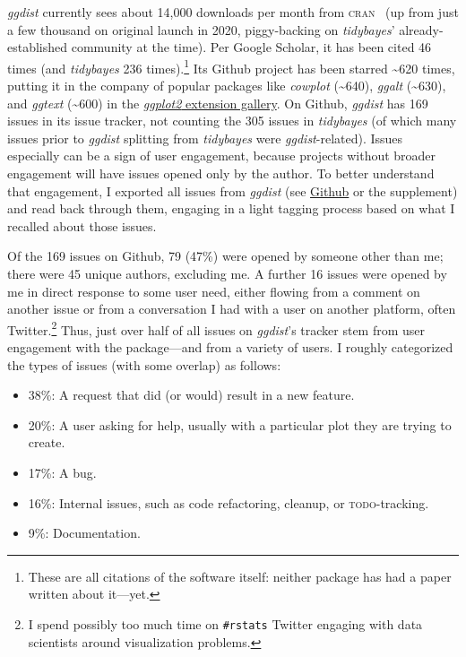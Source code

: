 \documentclass[journal]{vgtc}              %
\begin{document}
\textit{ggdist} currently sees about 14,000 downloads per month from \textsc{cran}~\cite{csardi2019cranlogs} (up from just a few thousand on original launch in 2020, piggy-backing on \textit{tidybayes}' already-established community at the time). Per Google Scholar, it has been cited 46 times (and \textit{tidybayes} 236 times).\footnote{These are all citations of the software itself: neither package has had a paper written about it---yet.} Its Github project has been starred \textasciitilde 620 times, putting it in the company of popular packages like \textit{cowplot} (\textasciitilde 640), \textit{ggalt} (\textasciitilde 630), and \textit{ggtext} (\textasciitilde 600) in the \href{https://exts.ggplot2.tidyverse.org/gallery/}{\textit{ggplot2} extension gallery}. On Github, \textit{ggdist} has 169 issues in its issue tracker, not counting the 305 issues in \textit{tidybayes} (of which many issues prior to \textit{ggdist} splitting from \textit{tidybayes }were \textit{ggdist}-related). Issues especially can be a sign of user engagement, because projects without broader engagement will have issues opened only by the author. To better understand that engagement, I exported all issues from \textit{ggdist} (see \href{https://github.com/mjskay/ggdist/issues}{Github} or the supplement) and read back through them, engaging in a light tagging process based on what I recalled about those issues.

Of the 169 issues on Github, 79 (47\%) were opened by someone other than me; there were 45 unique authors, excluding me. A further 16 issues were opened by me in direct response to some user need, either flowing from a comment on another issue or from a conversation I had with a user on another platform, often Twitter.\footnote{I spend possibly too much time on \texttt{\#rstats} Twitter engaging with data scientists around visualization problems.} Thus, just over half of all issues on \textit{ggdist}'s tracker stem from user engagement with the package---and from a variety of users. I roughly categorized the types of issues (with some overlap) as follows:

\begin{itemize}
    \item 38\%: A request that did (or would) result in a new feature.
    \item 20\%: A user asking for help, usually with a particular plot they are trying to create.
    \item 17\%: A bug.
    \item 16\%: Internal issues, such as code refactoring, cleanup, or \textsc{todo}-tracking.
    \item 9\%: Documentation.
\end{itemize}
\end{document}
